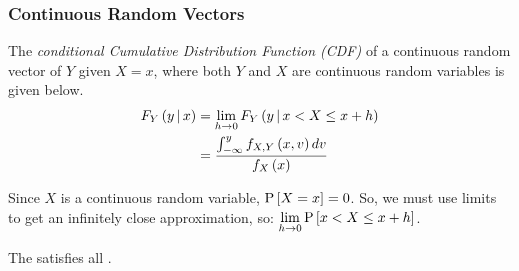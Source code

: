 \subsubsection{Continuous Random Vectors}\label{subsubsec:Conditional Probability Continuous Random Vectors}
\begin{definition}\label{def:Continuous Random Vector-Conditional CDF}
  The \emph{conditional Cumulative Distribution Function (CDF)} of a continuous random vector of $Y$ given $X=x$, where both $Y$ and $X$ are continuous random variables is given below.
  \begin{equation}
    \begin{aligned}
      F_{Y} \left( y \operatorname{\vert} x \right) &= \lim\limits_{h \to 0} F_{Y} \left( y \operatorname{\vert} x < X \leq x+h \right) \\
      &= \frac{\int_{-\infty}^{y} f_{X,Y} \left( x,v \right) dv}{f_{X} \left( x \right)} \\
    \end{aligned}
  \end{equation}
  \begin{remark}
    Since $X$ is a continuous random variable, $\operatorname{\operatorname{P}} \left[ X=x \right] =0$.
    So, we must use limits to get an infinitely close approximation, so: $\lim \limits_{h \to 0} \operatorname{\operatorname{P}} \left[ x < X \leq x+h \right]$.
  \end{remark}
  \begin{remark}
    The  satisfies all .
  \end{remark}
\end{definition}
